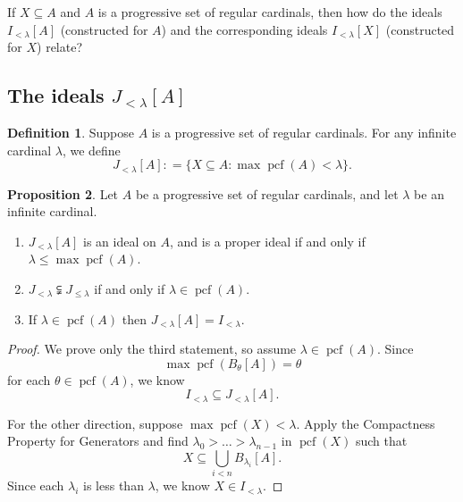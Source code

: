 \documentclass[10pt]{amsart}
\theoremstyle{plain}
\theoremstyle{definition}
\newtheorem{proposition}{Proposition}
\newtheorem{definition}[proposition]{Definition}
\theoremstyle{remark}
\DeclareMathOperator{\pcf}{pcf}
\numberwithin{equation}{section}
\begin{document}
\medskip

 If $X\subseteq A$ and $A$ is a progressive set of regular cardinals, then how do the ideals $I_{<\lambda}[A]$ (constructed for $A$) and the corresponding ideals $I_{<\lambda}[X]$ (constructed for $X$) relate?

\medskip

\subsection{The ideals $J_{<\lambda}[A]$}
\begin{definition}
Suppose $A$ is a progressive set of regular cardinals. For any infinite cardinal $\lambda$, we define
\begin{equation}
J_{<\lambda}[A]: = \{X\subseteq A: \max\pcf(A)<\lambda\}.
\end{equation}
\end{definition}

\begin{proposition}
Let $A$ be a progressive set of regular cardinals, and let $\lambda$ be an infinite cardinal.
\begin{enumerate}
\item $J_{<\lambda}[A]$ is an ideal on $A$, and is a proper ideal if and only if $\lambda\leq\max\pcf(A)$.
\item $J_{<\lambda}\subsetneqq J_{\leq\lambda}$ if and only if $\lambda\in\pcf(A)$.
\item If $\lambda\in\pcf(A)$ then $J_{<\lambda}[A]= I_{<\lambda}$.
\end{enumerate}
\end{proposition}
\begin{proof}
We prove only the third statement, so assume $\lambda\in\pcf(A)$.  Since
\begin{equation}
\max\pcf(B_\theta[A])=\theta
\end{equation}
for each $\theta\in\pcf(A)$, we know
\begin{equation}
I_{<\lambda}\subseteq J_{<\lambda}[A].
\end{equation}

For the other direction, suppose $\max\pcf(X)<\lambda$.  Apply the Compactness Property for Generators and
find $\lambda_0>\dots>\lambda_{n-1}$ in $\pcf(X)$ such that
\begin{equation}
X\subseteq \bigcup_{i<n}B_{\lambda_i}[A].
\end{equation}
Since each $\lambda_i$ is less than $\lambda$, we know $X\in I_{<\lambda}$.
\end{proof}
\end{document}
